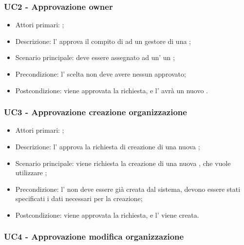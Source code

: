 \documentclass[../analisi-dei-requisiti]{subfiles}
\begin{document}
\subsubsection{UC2 - Approvazione owner}
\label{subsub:UC2}

\begin{itemize}
\item Attori primari: ;
\item Descrizione: l' approva il compito di  ad un gestore di una ;
\item Scenario principale: deve essere assegnato ad un' un ;
\item Precondizione: l' scelta non deve avere nessun  approvato;
\item Postcondizione: viene approvata la richiesta, e l' avrà un nuovo .

\end{itemize}
\subsubsection{UC3 - Approvazione creazione organizzazione}
\label{subsub:UC3}

\begin{itemize}
\item Attori primari: ;
\item Descrizione: l' approva la richiesta di creazione di una nuova ;
\item Scenario principale: viene richiesta la creazione di una nuova , che vuole utilizzare ;
\item Precondizione: l' non deve essere già creata dal sistema, devono essere stati specificati i dati necessari per la creazione;
\item Postcondizione: viene approvata la richiesta, e l' viene creata.

\end{itemize}
\subsubsection{UC4 - Approvazione modifica organizzazione}
\label{subsub:UC4}
\end{document}
